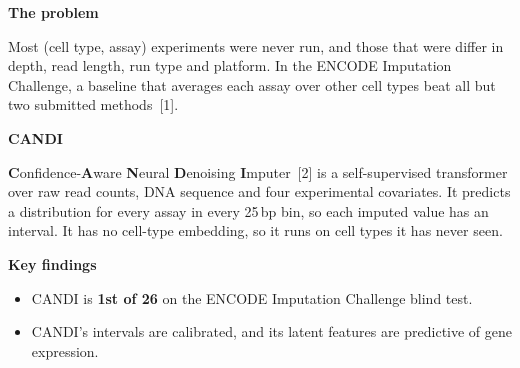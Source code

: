 \documentclass{article}
\newcommand{\boxtitle}[1]{{\fontsize{44}{54}\selectfont\bfseries\color{sfured}#1}\par\vspace{0.18in}}
\begin{document}
%
\begin{minipage}[t]{13.33in}
\vspace{0pt}
\begin{tcolorbox}[textbox, equal height group=intro]
\boxtitle{The problem}
Most (cell type, assay) experiments were never run, and those that were differ in
depth, read length, run type and platform. In the ENCODE Imputation Challenge, a
baseline that averages each assay over other cell types beat all but two submitted
methods~[1].
\end{tcolorbox}
\end{minipage}\hfill
\begin{minipage}[t]{13.33in}
\vspace{0pt}
\begin{tcolorbox}[textbox, equal height group=intro]
\boxtitle{CANDI}
\textbf{C}onfidence-\textbf{A}ware \textbf{N}eural \textbf{D}enoising
\textbf{I}mputer~[2] is a self-supervised transformer over raw read counts, DNA
sequence and four experimental covariates. It predicts a distribution for every
assay in every 25\,bp bin, so each imputed value has an interval. It has no
cell-type embedding, so it runs on cell types it has never seen.
\end{tcolorbox}
\end{minipage}\hfill
\begin{minipage}[t]{13.33in}
\vspace{0pt}
\begin{tcolorbox}[textbox, equal height group=intro]
\boxtitle{Key findings}
\begin{itemize}
  \item CANDI is \textbf{1st of 26} on the ENCODE Imputation Challenge blind test.
  \item CANDI's intervals are calibrated, and its latent features are predictive
        of gene expression.
\end{itemize}
\end{tcolorbox}
\end{minipage}
\end{document}
